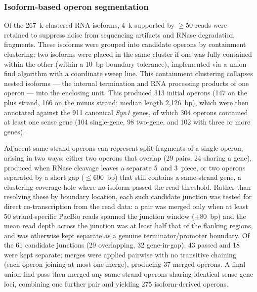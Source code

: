 
\subsubsection{Isoform-based operon segmentation}
\label{method:pacbio-operon}

Of the 267~k clustered RNA isoforms, 4~k supported by $\geq$50 reads were retained to suppress noise from sequencing artifacts and RNase degradation fragments.
These isoforms were grouped into candidate operons by containment clustering: two isoforms were placed in the same cluster if one was fully contained within the other (within a 10~bp boundary tolerance), implemented via a union-find algorithm with a coordinate sweep line. 
This containment clustering collapses nested isoforms — the internal termination and RNA processing products of one operon — into the enclosing unit.
This produced 313 initial operons (147 on the plus strand, 166 on the minus strand; median length 2{,}126~bp), which were then annotated against the 911 canonical \textit{Syn1} genes, of which 304 operons contained at least one sense gene (104 single-gene, 98 two-gene, and 102 with three or more genes).

Adjacent same-strand operons can represent split fragments of a single operon, arising in two ways: either two operons that overlap (29 pairs, 24 sharing a gene), produced when RNase cleavage leaves a separate 5\textquotesingle\ and 3\textquotesingle\ piece, or two operons separated by a short gap ($\leq$600~bp) that still contains a same-strand gene, a clustering coverage hole where no isoform passed the read threshold.
Rather than resolving these by boundary location, each such candidate junction was tested for direct co-transcription from the read data: a pair was merged only when at least 50 strand-specific PacBio reads spanned the junction window ($\pm$80~bp) and the mean read depth across the junction was at least half that of the flanking regions, and was otherwise kept separate as a genuine terminator/promoter boundary.
Of the 61 candidate junctions (29 overlapping, 32 gene-in-gap), 43 passed and 18 were kept separate; merges were applied pairwise with no transitive chaining (each operon joining at most one merge), producing 37 merged operons.
A final union-find pass then merged any same-strand operons sharing identical sense gene loci, combining one further pair and yielding 275 isoform-derived operons.

